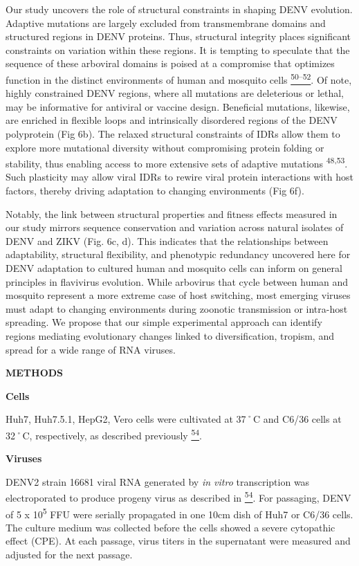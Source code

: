 \documentclass[
]{article}
\begin{document}
Our study uncovers the role of structural constraints in shaping DENV
evolution. Adaptive mutations are largely excluded from transmembrane
domains and structured regions in DENV proteins. Thus, structural
integrity places significant constraints on variation within these
regions. It is tempting to speculate that the sequence of these
arboviral domains is poised at a compromise that optimizes function in
the distinct environments of human and mosquito cells
\href{https://paperpile.com/c/REZjPf/KuSMk+gqelx+QZFTJ}{\textsuperscript{50--52}}.
Of note, highly constrained DENV regions, where all mutations are
deleterious or lethal, may be informative for antiviral or vaccine
design. Beneficial mutations, likewise, are enriched in flexible loops
and intrinsically disordered regions of the DENV polyprotein (Fig 6b).
The relaxed structural constraints of IDRs allow them to explore more
mutational diversity without compromising protein folding or stability,
thus enabling access to more extensive sets of adaptive mutations
\textsuperscript{48,53}. Such plasticity may allow viral IDRs to rewire
viral protein interactions with host factors, thereby driving adaptation
to changing environments (Fig 6f).~~

Notably, the link between structural properties and fitness effects
measured in our study mirrors sequence conservation and variation across
natural isolates of DENV and ZIKV (Fig. 6c, d). This indicates that the
relationships between adaptability, structural flexibility, and
phenotypic redundancy uncovered here for DENV adaptation to cultured
human and mosquito cells can inform on general principles in flavivirus
evolution. While arbovirus that cycle between human and mosquito
represent a more extreme case of host switching, most emerging viruses
must adapt to changing environments during zoonotic transmission or
intra-host spreading. We propose that our simple experimental approach
can identify regions mediating evolutionary changes linked to
diversification, tropism, and spread for a wide range of RNA viruses.

\textbf{METHODS}

\textbf{Cells}

Huh7, Huh7.5.1, HepG2, Vero cells were cultivated at 37˚C and C6/36
cells at 32˚C, respectively, as described previously
\href{https://paperpile.com/c/REZjPf/py7tY}{\textsuperscript{54}}.

\textbf{Viruses}

DENV2 strain 16681 viral RNA generated by \emph{in vitro} transcription
was electroporated to produce progeny virus as described in
\href{https://paperpile.com/c/REZjPf/py7tY}{\textsuperscript{54}}. For
passaging, DENV of 5 x 10\textsuperscript{5} FFU were serially
propagated in one 10cm dish of Huh7 or C6/36 cells. The culture medium
was collected before the cells showed a severe cytopathic effect (CPE).
At each passage, virus titers in the supernatant were measured and
adjusted for the next passage.
\end{document}
